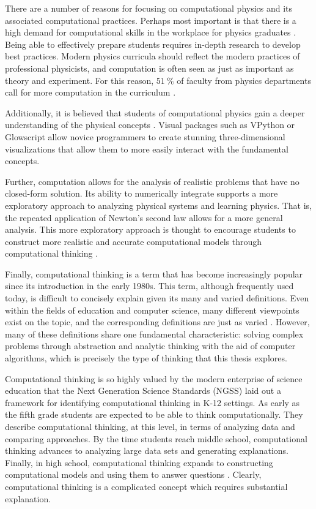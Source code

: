 \documentclass{msuphddissertation}
\begin{document}
\begin{doublespace}

There are a number of reasons for focusing on computational physics and its associated computational practices.  Perhaps most important is that there is a high demand for computational skills in the workplace for physics graduates \cite{AAPT2016}.  Being able to effectively prepare students requires in-depth research to develop best practices.  Modern physics curricula should reflect the modern practices of professional physicists, and computation is often seen as just as important as theory and experiment.  For this reason, $\SI{51}{\percent}$ of faculty from physics departments call for more computation in the curriculum \cite{Chonacky2008}.

Additionally, it is believed that students of computational physics gain a deeper understanding of the physical concepts \cite{Chabay2008,Kohlmyer2005}.  Visual packages such as VPython or Glowscript \cite{Sherer2000} allow novice programmers to create stunning three-dimensional visualizations that allow them to more easily interact with the fundamental concepts.

Further, computation allows for the analysis of realistic problems that have no closed-form solution.  Its ability to numerically integrate supports a more exploratory approach to analyzing physical systems and learning physics.  That is, the repeated application of Newton's second law allows for a more general analysis.  This more exploratory approach is thought to encourage students to construct more realistic and accurate computational models through computational thinking \cite{AAPT2016}.

Finally, computational thinking is a term that has become increasingly popular since its introduction in the early 1980s.  This term, although frequently used today, is difficult to concisely explain given its many and varied definitions.  Even within the fields of education and computer science, many different viewpoints exist on the topic, and the corresponding definitions are just as varied \cite{Grover2013}.  However, many of these definitions share one fundamental characteristic: solving complex problems through abstraction and analytic thinking with the aid of computer algorithms, which is precisely the type of thinking that this thesis explores.

Computational thinking is so highly valued by the modern enterprise of science education that the Next Generation Science Standards (NGSS) laid out a framework for identifying computational thinking in K-12 settings.  As early as the fifth grade students are expected to be able to think computationally.  They describe computational thinking, at this level, in terms of analyzing data and comparing approaches.  By the time students reach middle school, computational thinking advances to analyzing large data sets and generating explanations.  Finally, in high school, computational thinking expands to constructing computational models and using them to answer questions \cite{NGSS2012}.  Clearly, computational thinking is a complicated concept which requires substantial explanation.


\end{doublespace}
\end{document}
